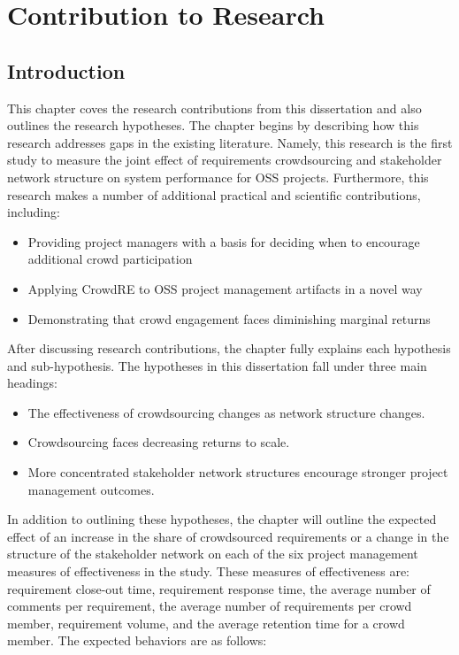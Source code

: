 \doublespacing
\chapter{Contribution to Research} \label{chap:contribution}

\section{Introduction}

This chapter coves the research contributions from this dissertation and also outlines the research hypotheses. The chapter begins by describing how this research addresses gaps in the existing literature. Namely, this research is the first study to measure the joint effect of requirements crowdsourcing and stakeholder network structure on system performance for OSS projects. Furthermore, this research makes a number of additional practical and scientific contributions, including:

\begin{itemize}
    \item Providing project managers with a basis for deciding when to encourage additional crowd participation
    \item Applying CrowdRE to OSS project management artifacts in a novel way
    \item Demonstrating that crowd engagement faces diminishing marginal returns
\end{itemize}

After discussing research contributions, the chapter fully explains each hypothesis and sub-hypothesis. The hypotheses in this dissertation fall under three main headings:

\begin{itemize}
    \item The effectiveness of crowdsourcing changes as network structure changes.
    \item Crowdsourcing faces decreasing returns to scale.
    \item More concentrated stakeholder network structures encourage stronger project management outcomes.
\end{itemize}

In addition to outlining these hypotheses, the chapter will outline the expected effect of an increase in the share of crowdsourced requirements or a change in the structure of the stakeholder network on each of the six project management measures of effectiveness in the study. These measures of effectiveness are: requirement close-out time, requirement response time,  the average number of comments per requirement, the average number of requirements per crowd member, requirement volume, and the average retention time for a crowd member. The expected behaviors are as follows:

